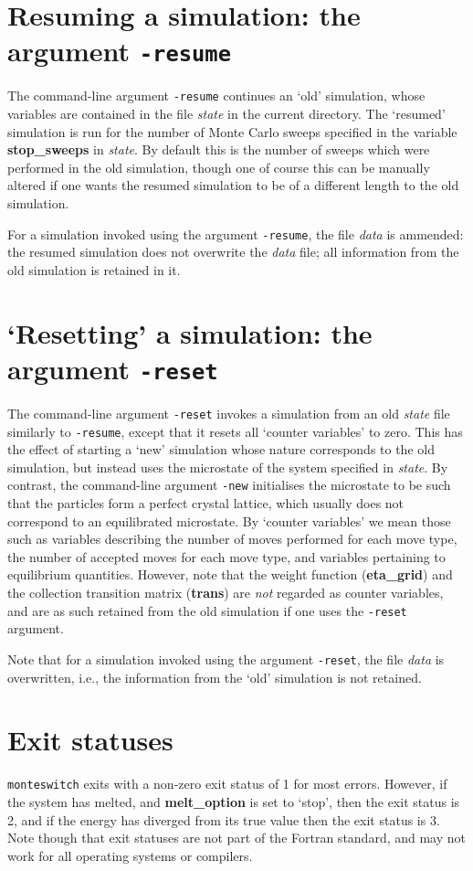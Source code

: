 \documentclass{report}
\begin{document}
\section{Resuming a simulation: the argument \texttt{-resume}}\label{sec:resume}
The command-line argument \texttt{-resume} continues an `old' simulation, whose variables are contained in the file \emph{state} in the current 
directory. The `resumed' simulation is run for the number of Monte Carlo sweeps specified in the variable \textbf{stop\_sweeps} in \emph{state}.
By default this is the number of sweeps which were performed in the old simulation, though one of course this can be manually altered if one wants
the resumed simulation to be of a different length to the old simulation.

For a simulation invoked using the argument \texttt{-resume}, the file \emph{data} is ammended: the resumed simulation does not overwrite the
\emph{data} file; all information from the old simulation is retained in it.

\section{`Resetting' a simulation: the argument \texttt{-reset}}\label{sec:reset}
The command-line argument \texttt{-reset} invokes a simulation from an old \emph{state} file similarly to \texttt{-resume}, except that it
resets all `counter variables' to zero. This has the effect of starting a `new' simulation whose nature corresponds to the old simulation, 
but instead uses the microstate of the system specified in \emph{state}. By contrast, the command-line argument \texttt{-new} initialises the 
microstate to be such that the particles form a perfect crystal lattice, which usually does not correspond to an equilibrated microstate.
By `counter variables' we mean those such as variables describing the number of moves performed for each move type, the number of accepted moves 
for each move type, and variables pertaining to equilibrium quantities. However, note that the weight function (\textbf{eta\_grid}) and the
collection transition matrix (\textbf{trans}) are \emph{not} regarded as counter variables, and are as such retained from the old simulation
if one uses the \texttt{-reset} argument.

Note that for a simulation invoked using the argument \texttt{-reset}, the file \emph{data} is overwritten, i.e., the information from the `old'
simulation is not retained.

\section{Exit statuses}
\texttt{monteswitch} exits with a non-zero exit status of 1 for most errors. However, if the system has melted, and \textbf{melt\_option} is set to
`stop', then the exit status is 2, and if the energy has diverged from its true value then the exit status is 3. 
Note though that exit statuses are not part of the Fortran standard, and may not work for all operating systems or compilers. 
\end{document}
